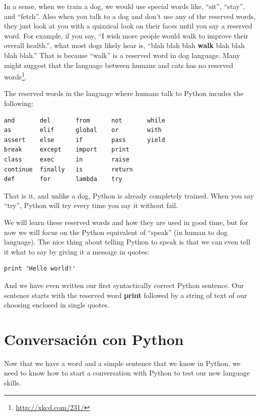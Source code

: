 In a sense, when we train a dog, we would use special words like,
``sit'', ``stay'', and ``fetch''.  Also when you talk to a dog and
don't use any of the reserved words, they just look at you with a 
quizzical look on their faces until you say a reserved word.  
For example, if you say, 
``I wish more people would walk to improve their overall health.'', 
what most dogs likely hear is,
``blah blah blah {\bf walk} blah blah blah blah.''
That is because ``walk'' is a reserved word in dog language.  Many
might suggest that the language between humans and cats has no
reserved words\footnote{\url{http://xkcd.com/231/}}.

The reserved words in the language where humans talk to 
Python incudes the following:

\beforeverb
\begin{verbatim}
and       del       from      not       while    
as        elif      global    or        with     
assert    else      if        pass      yield    
break     except    import    print              
class     exec      in        raise              
continue  finally   is        return             
def       for       lambda    try
\end{verbatim}
\afterverb
%
That is it, and unlike a dog, Python is already completely trained.
When you say ``try'', Python will try every time you say it without
fail.

We will learn these reserved words and how they are used in good time,
but for now we will focus on the Python equivalent of ``speak'' (in 
human to dog language).  The nice thing about telling Python to speak
is that we can even tell it what to say by giving it a message in quotes:

\beforeverb
\begin{verbatim}
print 'Hello world!'
\end{verbatim}
\afterverb

And we have even written our first syntactically correct Python sentence.
Our sentence starts with the reserved word {\bf print} followed
by a string of text of our choosing enclosed in single quotes.

\section{Conversaci\'on con Python}

Now that we have a word and a simple sentence that we know in Python,
we need to know how to start a conversation with Python to test 
our new language skills.

